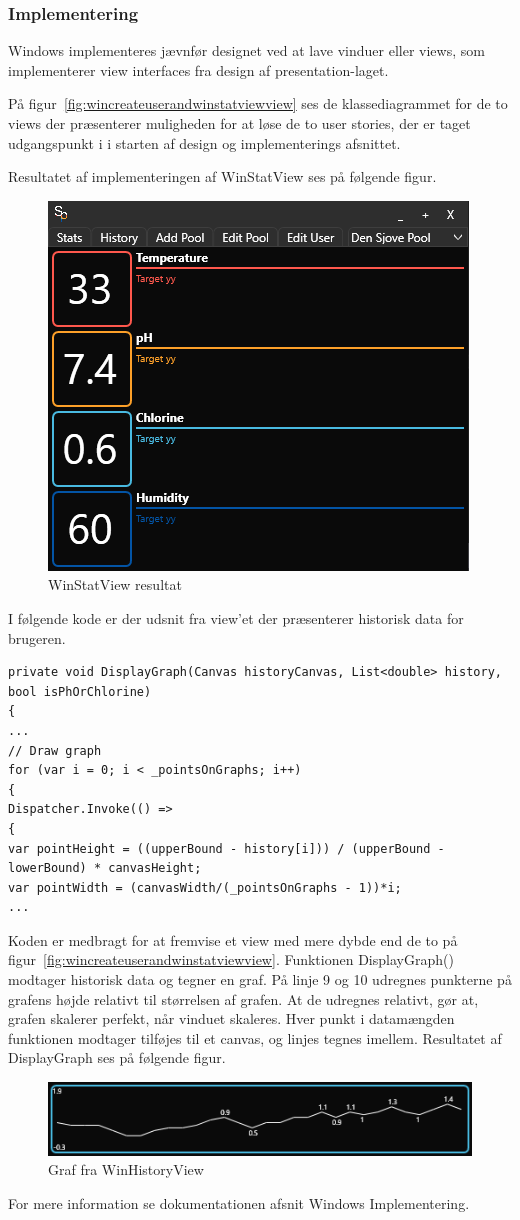 \subsubsection{Implementering}
Windows implementeres jævnfør designet ved at lave vinduer eller views, som implementerer view interfaces fra design af presentation-laget.

På figur~\ref{fig:wincreateuserandwinstatviewview} ses de klassediagrammet for de to views der præsenterer muligheden for at løse de to user stories, der er taget udgangspunkt i i starten af design og implementerings afsnittet.

Resultatet af implementeringen af WinStatView ses på følgende figur.

\begin{figure}
\centering
\includegraphics[width=0.5\linewidth]{figs/implementering/winstatview}
\caption{WinStatView resultat}
\label{fig:winstatview}
\end{figure}

I følgende kode er der udsnit fra view'et der præsenterer historisk data for brugeren. 

\begin{lstlisting}[caption=DisplayGraph, label=DisplayGraph]
private void DisplayGraph(Canvas historyCanvas, List<double> history, bool isPhOrChlorine)
{
...
// Draw graph
for (var i = 0; i < _pointsOnGraphs; i++)
{
Dispatcher.Invoke(() =>
{
var pointHeight = ((upperBound - history[i])) / (upperBound - lowerBound) * canvasHeight;
var pointWidth = (canvasWidth/(_pointsOnGraphs - 1))*i;
...
\end{lstlisting}

Koden er medbragt for at fremvise et view med mere dybde end de to på figur~\ref{fig:wincreateuserandwinstatviewview}.
Funktionen DisplayGraph() modtager historisk data og tegner en graf. 
På linje 9 og 10 udregnes punkterne på grafens højde relativt til størrelsen af grafen. At de udregnes relativt, gør at, grafen skalerer perfekt, når vinduet skaleres. 
Hver punkt i datamængden funktionen modtager tilføjes til et canvas, og linjes tegnes imellem.
Resultatet af DisplayGraph ses på følgende figur.

\begin{figure}
\centering
\includegraphics[width=0.4\linewidth]{figs/implementering/displaygraph}
\caption{Graf fra WinHistoryView}
\label{fig:displaygraph}
\end{figure}

For mere information se dokumentationen afsnit Windows Implementering.